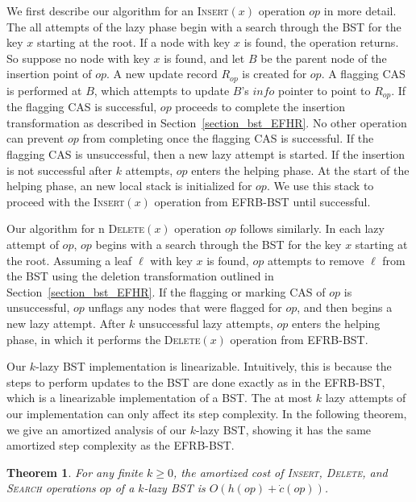 \documentclass[letterpaper]{article}
\newtheorem{theorem}{Theorem}[]
\newcommand{\info}{\mathit{info}}
\begin{document}
We first describe our algorithm for an \textsc{Insert}$(x)$ operation $op$ in more detail. The all attempts of the lazy phase begin with a search through the BST for the key $x$ starting at the root. If a node with key $x$ is found, the operation returns. So suppose no node with key $x$ is found, and let $B$ be the parent node of the insertion point of $op$. A new update record $R_{op}$ is created for $op$. A flagging CAS is performed at $B$, which attempts to update $B$'s $\info$ pointer to point to $R_{op}$. If the flagging CAS is successful, $op$ proceeds to complete the insertion transformation as described in Section~\ref{section_bst_EFHR}. No other operation can prevent $op$ from completing once the flagging CAS is successful. If the flagging CAS is unsuccessful, then a new lazy attempt is started. If the insertion is not successful after $k$ attempts, $op$ enters the helping phase. At the start of the helping phase, an new local stack is initialized for $op$. We use this stack to proceed with the \textsc{Insert}$(x)$ operation from EFRB-BST until successful.

Our algorithm for n \textsc{Delete}$(x)$ operation $op$ follows similarly. In each lazy attempt of $op$, $op$ begins with a search through the BST for the key $x$ starting at the root. Assuming a leaf $\ell$ with key $x$ is found, $op$ attempts to remove $\ell$ from the BST using the deletion transformation outlined in Section~\ref{section_bst_EFHR}. If the flagging or marking CAS of $op$ is unsuccessful, $op$ unflags any nodes that were flagged for $op$, and then begins a new lazy attempt. After $k$ unsuccessful lazy attempts, $op$ enters the helping phase, in which it performs the \textsc{Delete}$(x)$ operation from EFRB-BST.

Our $k$-lazy BST implementation is linearizable. Intuitively, this is because the steps to perform updates to the BST are done exactly as in the EFRB-BST, which is a linearizable implementation of a BST. The at most $k$ lazy attempts of our implementation can only affect its step complexity. In the following theorem, we give an amortized analysis of our $k$-lazy BST, showing it has the same amortized step complexity as the EFRB-BST.

\begin{theorem}
For any finite $k \geq 0$, the amortized cost of \textsc{Insert}, \textsc{Delete}, and \textsc{Search} operations $op$ of a $k$-lazy BST is $O(h(op) + \dot{c}(op))$.
\end{theorem}
\end{document}
